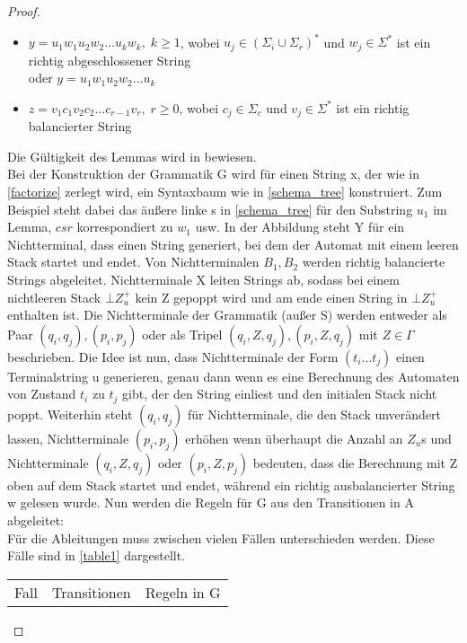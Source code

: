 \begin{proof}
\begin{lemma}
\begin{itemize}
\item
$y=u_1w_1u_2w_2...u_kw_k, \; k \geq 1$, wobei $u_j \in (\Sigma_i \cup \Sigma_r)^*$ und $w_j \in \Sigma^*$ ist ein richtig abgeschlossener String \\
oder $y=u_1w_1u_2w_2...u_k$
\item
$z=v_1c_1v_2c_2...c_{r-1}v_r, \; r\geq 0$, wobei $c_j \in \Sigma_c$ und $v_j \in \Sigma^*$ ist ein richtig balancierter String
\end{itemize}
\begin{figure}
\label{schema_tree}
\end{figure}
\end{lemma}
Die Gültigkeit des Lemmas wird in \cite{op_vpl_property} bewiesen.\\
Bei der Konstruktion der Grammatik G wird für einen String x, der wie in \autoref{factorize} zerlegt wird, ein Syntaxbaum wie in \autoref{schema_tree}  konstruiert. Zum Beispiel steht dabei das äußere linke s in \autoref{schema_tree} für den Substring $u_1$ im Lemma, $csr$ korrespondiert zu $w_1$ usw. 
In der Abbildung steht Y für ein Nichtterminal, dass einen String generiert, bei dem der Automat mit einem leeren Stack startet und endet.
Von Nichtterminalen $B_1, B_2$ werden richtig balancierte Strings abgeleitet. Nichtterminale X leiten Strings ab, sodass bei einem nichtleeren Stack $\bot Z_u^+$ kein Z gepoppt wird und am ende einen String in $\bot Z_u^+$ enthalten ist. Die Nichtterminale der Grammatik (außer S) werden entweder als Paar $(q_i, q_j) , (p_i, p_j)$ oder als Tripel $(q_i, Z, q_j), (p_i, Z, q_j)$ mit $Z \in \Gamma$ beschrieben. Die Idee ist nun, dass Nichtterminale der Form $(t_i...t_j)$ einen Terminalstring u generieren, genau dann wenn es eine Berechnung des Automaten  von Zustand $t_i$ zu $t_j$ gibt, der den String einliest und den initialen Stack nicht poppt. Weiterhin steht $(q_i, q_j)$ für Nichtterminale, die den Stack unverändert lassen, Nichtterminale $(p_i, p_j)$ erhöhen wenn überhaupt die Anzahl an $Z_u$s und Nichtterminale $(q_i, Z, q_j)$ oder $(p_i, Z, p_j)$ bedeuten, dass die Berechnung mit Z oben auf dem Stack startet und endet, während ein richtig ausbalancierter String w gelesen wurde. Nun werden die Regeln für G aus den Transitionen in A abgeleitet: \\
Für die Ableitungen muss zwischen vielen Fällen unterschieden werden. Diese Fälle sind in \autoref{table1} dargestellt.
\begin{table}
\scriptsize
\begin{tabular}{|l l l|}
\hline
Fall & Transitionen & Regeln in G \\

\end{tabular}
\end{table}
\end{proof}
